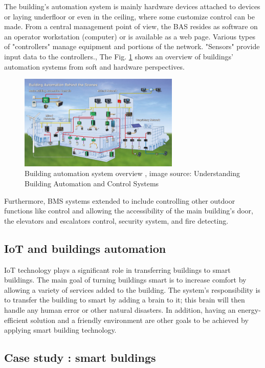 \documentclass[conference]{IEEEtran}
\begin{document}
The building's automation system is mainly hardware devices attached to devices or laying underfloor or even in the ceiling, where some customize control can be made. From a central management point of view, the BAS resides as software on an operator workstation (computer) or is available as a web page. Various types of "controllers" manage equipment and portions of the network. "Sensors" provide input data to the controllers.\cite{control}, The Fig. \ref{BAS} shows an overview of buildings' automation systems from soft and hardware perspectives. 


\begin{figure}[h!]
	\centering
	\includegraphics[width=3in]{BAS.png}
	\caption{\label{BAS}  Building automation system overview
		, image source: Understanding Building Automation and Control Systems
		\cite{control} }
\end{figure}

Furthermore, BMS systems extended to include controlling other outdoor functions like control and allowing the accessibility of the main building's door, the elevators and escalators control, security system, and fire detecting. 
 
 \subsection{IoT and buildings automation }
 
 IoT technology plays a significant role in transferring buildings to smart buildings. The main goal of turning buildings smart is to increase comfort by allowing a variety of services added to the building. The system's responsibility is to transfer the building to smart by adding a brain to it; this brain will then handle any human error or other natural disasters. In addition, having an energy-efficient solution and a friendly environment are other goals to be achieved by applying smart building technology. 

\subsection{Case study : smart buldings}
\end{document}

